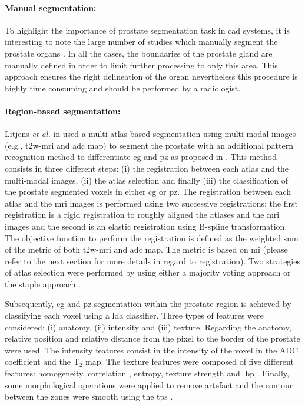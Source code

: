 \paragraph{Manual segmentation:}
To highlight the importance of prostate segmentation task in \ac{cad} systems, it is interesting to note the large number of studies which manually segment the prostate organs \cite{Artan2009,Artan2010,Matulewicz2013,Niaf2011,Niaf2012,Ozer2009,Ozer2010,Puech2009,Vos2008,Vos2008a}.
In all the cases, the boundaries of the prostate gland are manually defined in order to limit further processing to only this area.
This approach ensures the right delineation of the organ nevertheless this procedure is highly time consuming and should be performed by a radiologist.


\paragraph{Region-based segmentation:}
Litjens \textit{et al.} in \cite{Litjens2012} used a multi-atlas-based segmentation using multi-modal images (e.g., \ac{t2w}-\ac{mri} and \ac{adc} map) to segment the prostate with an additional pattern recognition method to differentiate \ac{cg} and \ac{pz} as proposed in \cite{Litjens2012a}.
This method consists in three different steps: (i) the registration between each atlas and the multi-modal images, (ii) the atlas selection and finally (iii) the classification of the prostate segmented voxels in either \ac{cg} or \ac{pz}. 
The registration between each atlas and the \ac{mri} images is performed using two successive registrations; the first registration is a rigid registration to roughly aligned the atlases and the \ac{mri} images and the second is an elastic registration using B-spline transformation.
The objective function to perform the registration is defined as the weighted sum of the metric of both \ac{t2w}-\ac{mri} and \ac{adc} map.
The metric is based on \ac{mi} (please refer to the next section for more details in regard to registration).
Two strategies of atlas selection were performed by using either a majority voting approach or the \ac{staple} approach \cite{Warfield2004}.

Subsequently,  \ac{cg} and \ac{pz} segmentation within the prostate region is achieved by classifying each voxel using a \ac{lda} classifier.
Three types of features were considered: (i) anatomy, (ii) intensity and (iii) texture.
Regarding the anatomy, relative position and relative distance from the pixel to the border of the prostate were used.
The intensity features consist in the intensity of the voxel in the ADC coefficient and the T$_2$ map.
The texture features were composed of five different features: homogeneity, correlation \cite{Amadasun1989}, entropy, texture strength \cite{Li2005a} and \ac{lbp} \cite{Ojala1996}.
Finally, some morphological operations were applied to remove artefact and the contour between the zones were smooth using the \ac{tps} \cite{Bookstein1989}.

